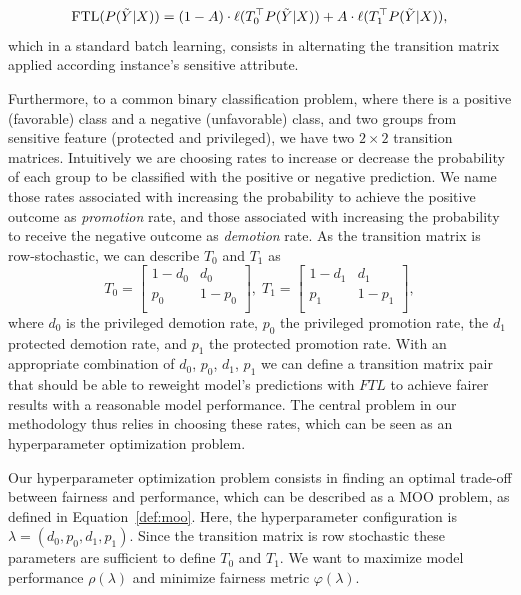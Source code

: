 \begin{equation}
    \operatorname{FTL}(P(\tilde{Y}|X)) = (1-A) \cdot \ell(T^{\top}_0 P(\tilde{Y}|X)) + A \cdot \ell(T^{\top}_1 P(\tilde{Y}|X)),
\end{equation}
which in a standard batch learning, consists in alternating the transition matrix applied according instance's sensitive attribute.

Furthermore, to a common binary classification problem, where there is a positive (favorable) class and a negative (unfavorable) class, and two groups from sensitive feature (protected and privileged), we have two $2\times2$ transition matrices. Intuitively we are choosing rates to increase or decrease the probability of each group to be classified with the positive or negative prediction. We name those rates associated with increasing the probability to achieve the positive outcome as \textit{promotion} rate, and those associated with increasing the probability to receive the negative outcome as \textit{demotion} rate. As the transition matrix is row-stochastic, we can describe $T_0$ and $T_1$ as
\begin{equation} \label{eq:transition_matrices}
    T_0 = \left[\begin{array}{cc}
        1-d_0 & d_0\\
        p_0 & 1-p_0\\
    \end{array}\right],\;
    T_1 = \left[\begin{array}{cc}
        1-d_1 & d_1\\
        p_1 & 1-p_1\\
    \end{array}\right],
\end{equation}
where $d_0$ is the privileged demotion rate, $p_0$ the privileged promotion rate, the $d_1$ protected demotion rate, and $p_1$ the protected promotion rate. With an appropriate combination of $d_0$, $p_0$, $d_1$, $p_1$ we can define a transition matrix pair that should be able to reweight model's predictions with $FTL$ to achieve fairer results with a reasonable model performance. The central problem in our methodology thus relies in choosing these rates, which can be seen as an hyperparameter optimization problem.

Our hyperparameter optimization problem consists in finding an optimal trade-off between fairness and performance, which can be described as a MOO problem, as defined in Equation~\ref{def:moo}. Here, the hyperparameter configuration is $\lambda = (d_0, p_0, d_1, p_1)$. Since the transition matrix is row stochastic these parameters are sufficient to define $T_0$ and $T_1$. We want to maximize model performance $\rho(\lambda)$ and minimize fairness metric $\varphi(\lambda)$. 

